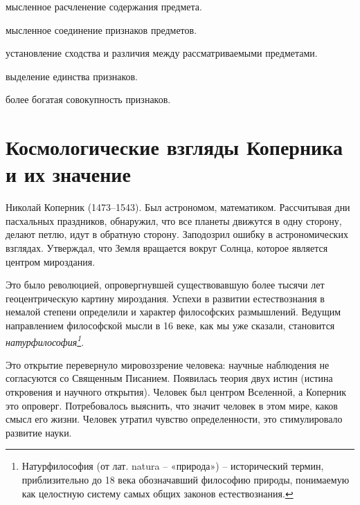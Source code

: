 \documentclass[
]{article}
\providecommand{\tightlist}{%
  \setlength{\itemsep}{0pt}\setlength{\parskip}{0pt}}
\begin{document}
\begin{description}
\tightlist
\item[\textbf{Анализ ---}]
мысленное расчленение содержания предмета.
\item[\textbf{Синтез ---}]
мысленное соединение признаков предметов.
\item[\textbf{Сравнение ---}]
установление сходства и различия между рассматриваемыми предметами.
\item[\textbf{Абстрагирование ---}]
выделение единства признаков.
\item[\textbf{Обобщение ---}]
более богатая совокупность признаков.
\end{description}

\hypertarget{ux43aux43eux441ux43cux43eux43bux43eux433ux438ux447ux435ux441ux43aux438ux435-ux432ux437ux433ux43bux44fux434ux44b-ux43aux43eux43fux435ux440ux43dux438ux43aux430-ux438-ux438ux445-ux437ux43dux430ux447ux435ux43dux438ux435}{%
\section{Космологические взгляды Коперника и их
значение}\label{ux43aux43eux441ux43cux43eux43bux43eux433ux438ux447ux435ux441ux43aux438ux435-ux432ux437ux433ux43bux44fux434ux44b-ux43aux43eux43fux435ux440ux43dux438ux43aux430-ux438-ux438ux445-ux437ux43dux430ux447ux435ux43dux438ux435}}

Николай Коперник (1473--1543). Был астрономом, математиком. Рассчитывая
дни пасхальных праздников, обнаружил, что все планеты движутся в одну
сторону, делают петлю, идут в обратную сторону. Заподозрил ошибку в
астрономических взглядах. Утверждал, что Земля вращается вокруг Солнца,
которое является центром мироздания.

Это было революцией, опровергнувшей существовавшую более тысячи лет
геоцентрическую картину мироздания. Успехи в развитии естествознания в
немалой степени определили и характер философских размышлений. Ведущим
направлением философской мысли в 16 веке, как мы уже сказали, становится
\emph{натурфилософия\footnote{Натурфилософия (от лат. natura --
  «природа») -- исторический термин, приблизительно до 18 века
  обозначавший философию природы, понимаемую как целостную систему самых
  общих законов естествознания.}}.

Это открытие перевернуло мировоззрение человека: научные наблюдения не
согласуются со Священным Писанием. Появилась теория двух истин (истина
откровения и научного открытия). Человек был центром Вселенной, а
Коперник это опроверг. Потребовалось выяснить, что значит человек в этом
мире, каков смысл его жизни. Человек утратил чувство определенности, это
стимулировало развитие науки.
\end{document}
